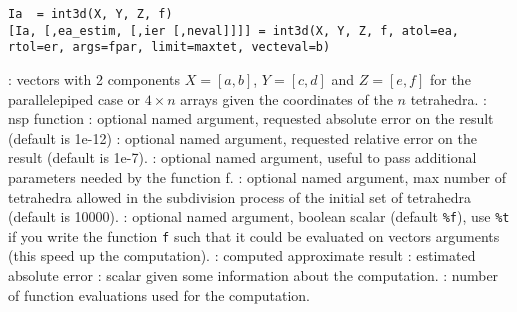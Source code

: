 
\begin{mandesc}
\end{mandesc}

\begin{calling_sequence}
\begin{verbatim}
Ia  = int3d(X, Y, Z, f)
[Ia, [,ea_estim, [,ier [,neval]]]] = int3d(X, Y, Z, f, atol=ea, rtol=er, args=fpar, limit=maxtet, vecteval=b)
\end{verbatim}
\end{calling_sequence}
\begin{parameters}
  \begin{varlist}
    : vectors with 2 components $X=[a,b]$, $Y=[c,d]$ and $Z = [e,f]$ for
    the parallelepiped case or  $4 \times n$ arrays given the coordinates of the $n$ tetrahedra.
    : nsp function
    : optional named argument, requested absolute error
                      on the result (default is 1e-12)
    : optional named argument, requested relative error
                      on the result (default is 1e-7).
    : optional named argument, useful to pass
    additional parameters needed by the function f.
    : optional named argument, max number of
    tetrahedra allowed in the subdivision process of the initial set of
    tetrahedra (default is 10000).
    : optional named argument, boolean scalar
    (default \verb+%f+), use \verb+%t+ if you write the function
    \verb+f+ such that it could be evaluated on vectors arguments 
    (this speed up the computation).
    : computed approximate result
    : estimated absolute error
    : scalar given some information about the computation.
    : number of function evaluations used for the computation.
  \end{varlist}
\end{parameters}

